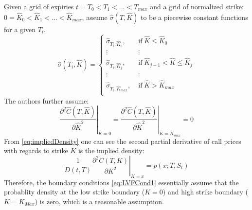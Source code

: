 \documentclass[letterpaper,12pt,titlepage,oneside,final]{book}
\numberwithin{equation}{section}
\theoremstyle{definition}
\begin{document}
Given a grid of expiries $t=T_0 < T_1 < \dots< T_{max} $ and  a grid of normalized strike: $0=\widehat{K}_0<\widehat{K}_1<\dots<\widehat{K}_{max}$, \citet{andreasen2010volatility} assume $\widehat{\sigma}(T,\widehat{K})$  to be a piecewise constant functions for a given $T_i$.
\[
	\widehat{\sigma}(T_i,\widehat{K})=\left\{ \begin{array}{ll}
		\widehat{\sigma}_{T_i,\widehat{K}_0}  , \; &\text{if} \; \widehat{K} \leq \widehat{K}_0\\
		\vdots & \vdots\\
		\widehat{\sigma}_{T_i,\widehat{K}_j}  , \; &\text{if} \; \widehat{K}_{j-1}<\widehat{K} \leq \widehat{K}_j\\
		\vdots & \vdots\\
		\widehat{\sigma}_{T_i,\widehat{K}_{max}} , \; &\text{if} \;  \widehat{K} > \widehat{K}_{max} \\
		\end{array} \right.
\]
The authors further assume:
\begin{equation}
	\left. \frac{\partial^2 \widehat{C}(T,\widehat{K})}{ \partial \widehat{K}^2}\right\vert_{\widehat{K}=0}=\left. \frac{\partial^2 \widehat{C}(T,\widehat{K})}{ \partial \widehat{K}^2}\right\vert_{\widehat{K}=\widehat{K}_{max}}=0
 \label{eq:LVFCond1}
\end{equation}
From \eqref{eq:impliedDensity} one can see the second partial derivative of call prices with regards to strike $K$ is the implied density:
\[
	\frac{1}{D(t,T)} \left. \frac{\partial^2 C(T,K)}{\partial K^2} \right\vert_{K=x}=	p(x;T,S_t) 
\]
 Therefore, the boundary conditions \eqref{eq:LVFCond1} essentially assume that the probablity density at the  low strike boundary ($K=0$) and  high strike boundary ($K=K_{Max}$) is zero, which is a reasonable assumption.
\end{document}
